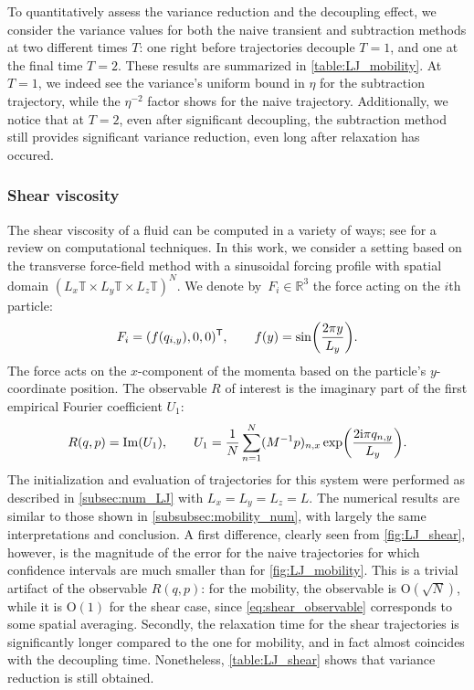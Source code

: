 \documentclass[11pt]{article}
\newcommand{\T}{\mathbb{T}}
\newcommand{\R}{\mathbb{R}}
\newcommand{\bigO}{\mathrm{O}}
\renewcommand{\t}{\mathsf T}
\renewcommand{\Im}{\operatorname{Im}}
\DeclarePairedDelimiter\paren{\lparen}{\rparen}
\theoremstyle{definition}
\begin{document}
To quantitatively assess the variance reduction and the decoupling effect, we consider the variance values for both the naive transient and subtraction methods at two different times $T$: one right before trajectories decouple $T=1$, and one at the final time $T=2$. These results are summarized in \cref{table:LJ_mobility}. At $T=1$, we indeed see the variance's uniform bound in $\eta$ for the subtraction trajectory, while the $\eta^{-2}$ factor shows for the naive trajectory. Additionally, we notice that at $T=2$, even after significant decoupling, the subtraction method still provides significant variance reduction, even long after relaxation has occured.

\subsubsection{Shear viscosity}
\label{subsubsec:shear}
The shear viscosity of a fluid can be computed in a variety of ways; see \cite{todd2007} for a review on computational techniques. In this work, we consider a setting based on the transverse force-field method \cite{gosling1973,joubaud2012} with a sinusoidal forcing profile with spatial domain $(L_x\T \times L_y\T \times L_z\T)^N$. We denote by~$F_i\in\R^3$ the force acting on the $i$th particle:
\begin{equation}
    F_i = (f(q_{i,y}), 0, 0)^\t, \qquad  f(y) = \sin\paren*{\frac{2\pi y}{L_y}}.
\end{equation}
The force acts on the $x$-component of the momenta based on the particle's $y$-coordinate position.
The observable $R$ of interest is the imaginary part of the first empirical Fourier coefficient $U_1$:
\begin{equation}
    R(q,p) = \Im(U_1), \qquad U_1 = \frac{1}{N}\sum_{n=1}^N (M^{-1}p)_{n,x}\exp\paren*{\frac{2\mathrm{i}\pi q_{n,y}}{L_y}}.
    \label{eq:shear_observable}
\end{equation}
The initialization and evaluation of trajectories for this system were performed as described in \cref{subsec:num_LJ} with $L_x=L_y=L_z=L$. The numerical results are similar to those shown in \cref{subsubsec:mobility_num}, with largely the same interpretations and conclusion. A first difference, clearly seen from \cref{fig:LJ_shear}, however, is the magnitude of the error for the naive trajectories for which confidence intervals are much smaller than for \cref{fig:LJ_mobility}. This is a trivial artifact of the observable $R(q,p)$: for the mobility, the observable is $\bigO(\sqrt{N})$, while it is $\bigO(1)$ for the shear case, since \eqref{eq:shear_observable} corresponds to some spatial averaging. Secondly, the relaxation time for the shear trajectories is significantly longer compared to the one for mobility, and in fact almost coincides with the decoupling time. Nonetheless, \cref{table:LJ_shear} shows that variance reduction is still obtained.
\end{document}
